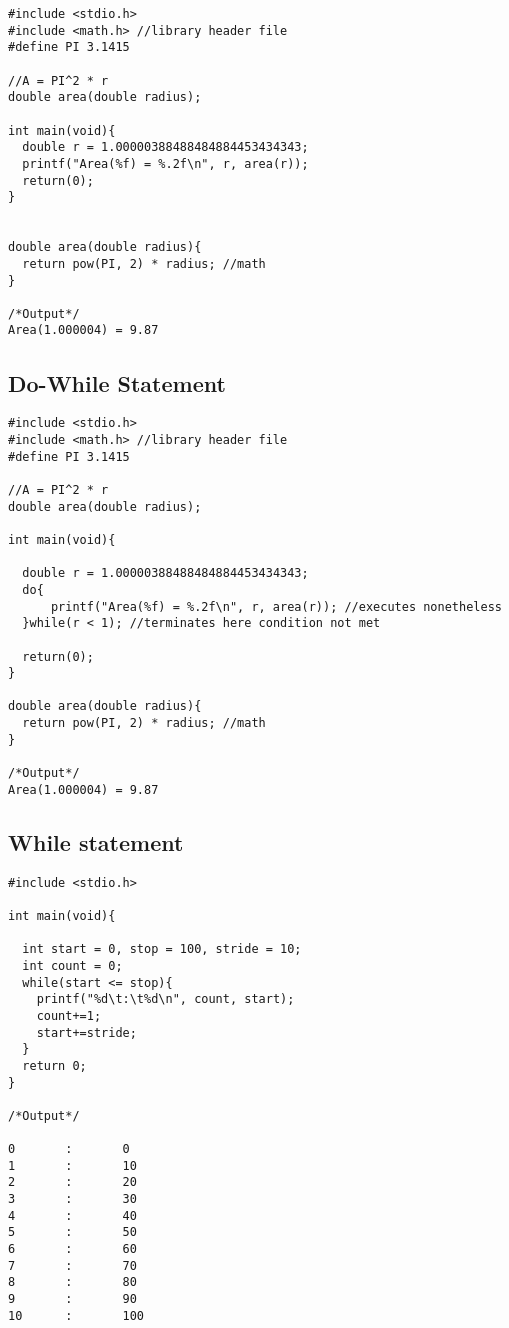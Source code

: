 \documentclass[10pt, a4paper, twocolumn]{article} %
\begin{document}
\begin{lstlisting}
#include <stdio.h>
#include <math.h> //library header file
#define PI 3.1415

//A = PI^2 * r
double area(double radius);

int main(void){
  double r = 1.00000388488484884453434343;
  printf("Area(%f) = %.2f\n", r, area(r));
  return(0);
}


double area(double radius){
  return pow(PI, 2) * radius; //math
}

/*Output*/
Area(1.000004) = 9.87
\end{lstlisting}

\newpage
\subsection{Do-While Statement}

\begin{lstlisting}
#include <stdio.h>
#include <math.h> //library header file
#define PI 3.1415

//A = PI^2 * r
double area(double radius);

int main(void){

  double r = 1.00000388488484884453434343;
  do{
      printf("Area(%f) = %.2f\n", r, area(r)); //executes nonetheless
  }while(r < 1); //terminates here condition not met

  return(0);
}

double area(double radius){
  return pow(PI, 2) * radius; //math
}

/*Output*/
Area(1.000004) = 9.87

\end{lstlisting}

\subsection{While statement}

\begin{lstlisting}
#include <stdio.h>

int main(void){

  int start = 0, stop = 100, stride = 10;
  int count = 0;
  while(start <= stop){
    printf("%d\t:\t%d\n", count, start);
    count+=1;
    start+=stride;
  }
  return 0;
}

/*Output*/

0       :       0
1       :       10
2       :       20
3       :       30
4       :       40
5       :       50
6       :       60
7       :       70
8       :       80
9       :       90
10      :       100
\end{lstlisting}
\end{document}
